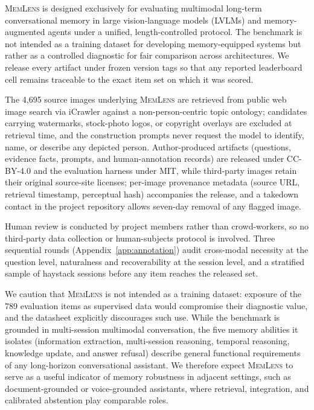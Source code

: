 \documentclass{article}
\newcommand{\bench}{\textsc{MemLens}}
\begin{document}
\bench{} is designed exclusively for evaluating multimodal long-term conversational memory in large vision-language models (LVLMs) and memory-augmented agents under a unified, length-controlled protocol. The benchmark is not intended as a training dataset for developing memory-equipped systems but rather as a controlled diagnostic for fair comparison across architectures. We release every artifact under frozen version tags so that any reported leaderboard cell remains traceable to the exact item set on which it was scored.

The 4{,}695 source images underlying \bench{} are retrieved from public web image search via iCrawler against a non-person-centric topic ontology; candidates carrying watermarks, stock-photo logos, or copyright overlays are excluded at retrieval time, and the construction prompts never request the model to identify, name, or describe any depicted person. Author-produced artifacts (questions, evidence facts, prompts, and human-annotation records) are released under CC-BY-4.0 and the evaluation harness under MIT, while third-party images retain their original source-site licenses; per-image provenance metadata (source URL, retrieval timestamp, perceptual hash) accompanies the release, and a takedown contact in the project repository allows seven-day removal of any flagged image.

Human review is conducted by project members rather than crowd-workers, so no third-party data collection or human-subjects protocol is involved. Three sequential rounds (Appendix~\ref{app:annotation}) audit cross-modal necessity at the question level, naturalness and recoverability at the session level, and a stratified sample of haystack sessions before any item reaches the released set.

We caution that \bench{} is not intended as a training dataset: exposure of the 789 evaluation items as supervised data would compromise their diagnostic value, and the datasheet explicitly discourages such use. While the benchmark is grounded in multi-session multimodal conversation, the five memory abilities it isolates (information extraction, multi-session reasoning, temporal reasoning, knowledge update, and answer refusal) describe general functional requirements of any long-horizon conversational assistant. We therefore expect \bench{} to serve as a useful indicator of memory robustness in adjacent settings, such as document-grounded or voice-grounded assistants, where retrieval, integration, and calibrated abstention play comparable roles.
\end{document}
